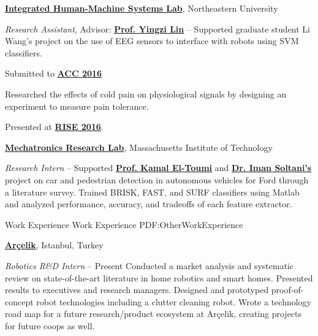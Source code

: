 \documentclass[letterpaper,MMMyyyy,nonstopmode]{simpleresumecv}
\begin{document}
\begin{Body}

\Entry
\href{http://www1.coe.neu.edu/~yilin/ihmslab.html}
{\textbf{Integrated Human-Machine Systems Lab}},
Northeastern University

\Gap
\textit{Research Assistant}, Advisor:
\href{http://www1.coe.neu.edu/~yilin/director.html}{\textbf{Prof. Yingzi Lin}}
\hfill
{} --
\BulletItem
Supported graduate student Li Wang's project on the use of EEG sensors to interface with robots using SVM classifiers. 
\begin{Detail}
	\Item
	Submitted to \href{http://acc2016.a2c2.org/}{\textbf{ACC 2016}}
\end{Detail}
\BulletItem
Researched the effects of cold pain on physiological signals by designing an experiment to measure pain tolerance.
\begin{Detail}
	\Item
	Presented at \href{https://www.northeastern.edu/rise/}{\textbf{RISE 2016}}. 
\end{Detail}


\Entry
\href{null.html}
{\textbf{Mechatronics Research Lab}},
Massachusetts Institute of Technology

\Gap
\textit{Research Intern}
\hfill
{} --
\BulletItem
Supported \href{}{\textbf{Prof. Kamal El-Toumi}} and \href{URL}{\textbf{Dr. Iman Soltani's}} project on car and pedestrian detection in autonomous vehicles for Ford through a literature survey. Trained BRISK, FAST, and SURF classifiers using Matlab and analyzed performance, accuracy, and tradeoffs of each feature extractor.


\Section
{Work Experience}
{Work Experience}
{PDF:OtherWorkExperience}


\Entry
\href{http://www.arcelikas.com/page/69/Technology_and_Innovation}
{\textbf{Ar\c{c}elik}}, 
Istanbul, Turkey

\Gap
\textit{Robotics R\&D Intern}
\hfill
{} -- Present
\BulletItem
Conducted a market analysis and systematic review on state-of-the-art literature in home robotics and smart homes. Presented results to executives and research managers.
\BulletItem
Designed and prototyped proof-of-concept robot technologies including a clutter cleaning robot.
\BulletItem
Wrote a technology road map for a future research/product ecosystem at Ar\c{c}elik, creating projects for future coops as well.
\SectionSpace


\end{Body}
\end{document}
